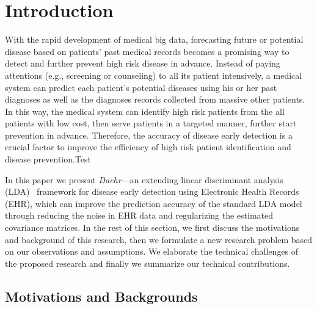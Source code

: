 \documentclass[journal,compsoc]{IEEEtran}
\newcommand{\TheName}{\mbox{\emph{Daehr}}}
\begin{document}
%
\IEEEpeerreviewmaketitle

\section{Introduction}

With the rapid development of medical big data, forecasting future or potential disease based on patients' past medical records becomes a promising way to detect and further prevent high risk disease in advance.
Instead of paying attentions (e.g., screening or counseling)  to all its patient intensively, a medical system can predict each patient's potential diseases using his or her past diagnoses as well as the diagnoses records collected from massive other patients.
In this way, the medical system can identify high risk patients from the all patients with low cost, then serve patients in a targeted manner, further start prevention in advance.
Therefore, the accuracy of disease early detection is a crucial factor to improve the efficiency of high risk patient identification and disease prevention.Test


In this paper we present \TheName---an extending linear discriminant analysis (LDA)~\cite{fisher1936use,mclachlan2004discriminant} framework for disease early detection using Electronic Health Records (EHR), which can improve the prediction accuracy of the standard LDA model through reducing the noise in EHR data and regularizing the estimated covariance matrices.
In the rest of this section, we first discuss the motivations and background of this research, then we formulate a new research problem based on our observations and assumptions.
We elaborate the technical challenges of the proposed research and finally we summarize our technical contributions.


\subsection{Motivations and Backgrounds}
\end{document}
